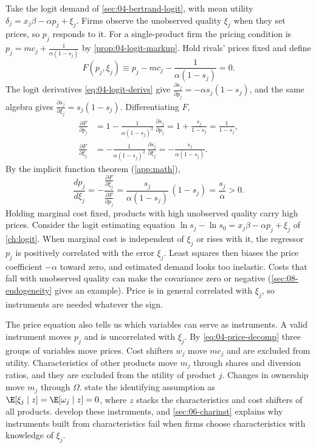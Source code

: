Take the logit demand of \cref{sec:04-bertrand-logit}, with mean utility $\delta_j = x_j\beta - \alpha p_j +
\xi_j$. Firms observe the unobserved quality $\xi_j$ when they set prices, so $p_j$ responds to it. For a
single-product firm the pricing condition is $p_j = mc_j + \frac{1}{\alpha(1 - s_j)}$ by
\cref{prop:04-logit-markup}. Hold rivals' prices fixed and define
\begin{equation*}
F(p_j, \xi_j) \equiv p_j - mc_j - \frac{1}{\alpha(1 - s_j)} = 0 .
\end{equation*}
The logit derivatives \eqref{eq:04-logit-derivs} give $\frac{\partial s_j}{\partial p_j} = -\alpha s_j(1 - s_j)$,
and the same algebra gives $\frac{\partial s_j}{\partial \xi_j} = s_j(1 - s_j)$. Differentiating $F$,
\begin{align*}
\frac{\partial F}{\partial p_j} &= 1 - \frac{1}{\alpha(1 - s_j)^2}\,\frac{\partial s_j}{\partial p_j}
  = 1 + \frac{s_j}{1 - s_j} = \frac{1}{1 - s_j}, \\
\frac{\partial F}{\partial \xi_j} &= -\frac{1}{\alpha(1 - s_j)^2}\,\frac{\partial s_j}{\partial \xi_j}
  = -\frac{s_j}{\alpha(1 - s_j)} .
\end{align*}
By the implicit function theorem (\cref{app:math}),
\begin{equation}\label{eq:04-dp-dxi}
\frac{d p_j}{d \xi_j} = -\frac{\frac{\partial F}{\partial \xi_j}}{\frac{\partial F}{\partial p_j}}
= \frac{s_j}{\alpha(1 - s_j)}\,(1 - s_j) = \frac{s_j}{\alpha} > 0 .
\end{equation}
Holding marginal cost fixed, products with high unobserved quality carry high prices. Consider the logit estimating
equation $\ln s_j - \ln s_0 = x_j\beta - \alpha p_j + \xi_j$ of \cref{ch:logit}. When marginal cost is independent
of $\xi_j$ or rises with it, the regressor $p_j$ is positively correlated with the error $\xi_j$. Least squares then
biases the price coefficient $-\alpha$ toward zero, and estimated demand looks too inelastic. Costs that fall with
unobserved quality can make the covariance zero or negative (\cref{sec:08-endogeneity} gives an example). Price is
in general correlated with $\xi_j$, so instruments are needed whatever the sign.

The price equation also tells us which variables can serve as instruments. A valid instrument moves $p_j$ and is
uncorrelated with $\xi_j$. By \eqref{eq:04-price-decomp} three groups of variables move prices. Cost shifters
$w_j$ move $mc_j$ and are excluded from utility. Characteristics of other products move $m_j$ through shares and
diversion ratios, and they are excluded from the utility of product $j$. Changes in ownership move $m_j$ through
$\Omega$. \citet[eq.~(4.1)]{BerryLevinsohnPakes1995} state the identifying assumption as $\E[\xi_j \mid z] =
\E[\omega_j \mid z] = 0$, where $z$ stacks the characteristics and cost shifters of all products.
 develop these instruments, and \cref{sec:06-charinst} explains why instruments built from
characteristics fail when firms choose characteristics with knowledge of $\xi_j$.

